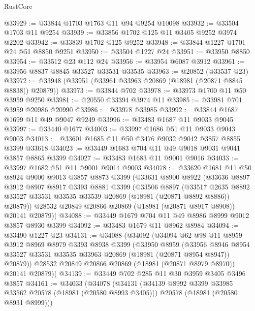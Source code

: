 \begin{lexlean}{RustCore}
\begin{coremodule}
@33929 := @33844 @1703 @1763 @11 @94 @9254 @10098
@33932 := @33504 @1703 @11 @9254
@33939 := @33856 @1702 @125 @11 @3405 @9252 @3974 @2202
@33942 := @33839 @1702 @125 @9252
@33948 := @33844 @1227 @1701 @24 @51 @8850 @9251
@33950 := @33504 @1227 @24
@33951 := @33950 @8850
@33954 := @33512 @23 @112 @24
@33956 := @33954 @6087 @3912
@33961 := @33956 @8837 @8845 @33527 @33531 @33535
@33963 := @20852 (@33537 @23)
@33972 := @33948 (@33951 (@33961 @33963 @20869 (@18981 (@20871 @8845 @8838)) @20879))
@33973 := @33844 @702
@33978 := @33973 @1700 @11 @50 @3959 @9250
@33981 := @20550 @33394 @3974 @11
@33985 := @33981 @701 @3959 @20986 @20990
@33986 := @33978 @33985
@33992 := @33844 @1687 @1699 @11 @49 @9047 @9249
@33996 := @33483 @1687 @11 @9033 @9045
@33997 := @33440 @1677
@34003 := @33997 @1686 @51 @11 @9033 @9043 @9003
@34013 := @33601 @1685 @11 @50 @3476 @9032 @9042 @3857 @8855 @3399 @33618
@34023 := @33449 @1683 @704 @11 @49 @9018 @9031 @9041 @3857 @8865 @3399
@34027 := @33483 @1683 @11 @9001 @9016
@34033 := @33997 @1682 @51 @11 @9001 @9014 @9003
@34078 := @33620
    @1681
    @11
    @50
    @8924
    @9000
    @9013
    @3857
    @8873
    @3399
    (@33631
      @8900
      @8922
      (@33636
        @8897
        @3912
        @8907
        @8917
        @3393
        @8881
        @3399
        (@33506
          @8897
          (@33517
            @2635
            @8892
            @33527
            @33531
            @33535
            @33539
            @20869
            (@18981 (@20871 @8892 @8886))
            @20879))
        @28532
        @20849
        @20866
        @20869
        (@18981 (@20871 @8917 @8908))
        @20141
        @20879))
@34088 := @33449 @1679 @704 @11 @49 @8986 @8999 @9012 @3857 @8930 @3399
@34092 := @33483 @1679 @11 @8962 @8984
@34094 := @33490 @1227 @23
@34131 := @34088
    (@34092
      (@34094
        @62
        @98
        @11
        @8959
        @3912
        @8969
        @8979
        @3393
        @8938
        @3399
        (@33950
          @8959
          (@33956
            @8946
            @8954
            @33527
            @33531
            @33535
            @33963
            @20869
            (@18981 (@20871 @8954 @8947))
            @20879))
        @28532
        @20849
        @20866
        @20869
        (@18981 (@20871 @8979 @8970))
        @20141
        @20879))
@34139 := @33449 @702 @285 @11 @30 @3959 @3405 @3496 @3857
@34161 := @34033
    (@34078
      (@34131
        (@34139 @8992 @3399 @33985 @33562 @20578 (@18981 (@20580 @8993 @3405)))
        @20578
        (@18981 (@20580 @8931 @8999)))

\end{coremodule}
\end{lexlean}
